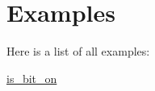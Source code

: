 \section{Examples}
Here is a list of all examples\+:\begin{DoxyCompactItemize}
\item 
\hyperlink{is_bit_on-example}{is\+\_\+bit\+\_\+on}
\end{DoxyCompactItemize}
